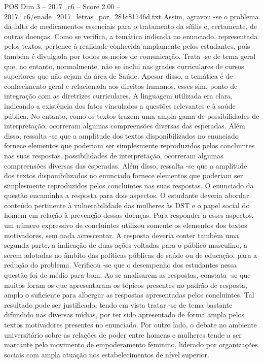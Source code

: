 \begin{textsample}{POS Dim 3 – 2017\_c6 – Score 2.00 – 2017\_c6/enade\_2017\_letras\_por\_281c81746d.txt}
Assim, agravou -se o problema da falta de medicamentos essenciais para o tratamento da sífilis e, certamente, de outras doenças.
Como se verifica, a temática indicada no enunciado, representada pelos textos, pertence à realidade conhecida amplamente pelos estudantes, pois também é divulgada por todos os meios de comunicação.
Trata -se de tema geral que, no entanto, normalmente, não se inclui nas grades curriculares de cursos superiores que não sejam da área de Saúde.
Apesar disso, a temática é de conhecimento geral e relacionada aos direitos humanos, esses sim, ponto de integração com as diretrizes curriculares.
A linguagem utilizada era clara, indicando a existência dos fatos vinculados a questões relevantes e à saúde pública.
No entanto, como os textos trazem uma ampla gama de possibilidades de interpretação, ocorreram algumas compreensões diversas das esperadas.
Além disso, ressalta -se que a amplitude dos textos disponibilizados no enunciado fornece elementos que poderiam ser simplesmente reproduzidos pelos concluintes nas suas respostas. possibilidades de interpretação, ocorreram algumas compreensões diversas das esperadas.
Além disso, ressalta -se que a amplitude dos textos disponibilizados no enunciado fornece elementos que poderiam ser simplesmente reproduzidos pelos concluintes nas suas respostas.
O enunciado da questão encaminha a resposta para dois aspectos.
O estudante deveria abordar conteúdo pertinente à vulnerabilidade das mulheres às DST e o papel social do homem em relação à prevenção dessas doenças.
Para responder a esses aspectos, um número expressivo de concluintes utilizou somente os elementos dos textos motivadores, sem nada acrescentar.
A resposta deveria conter também uma segunda parte, a indicação de duas ações voltadas para o público masculino, a serem adotadas no âmbito das políticas públicas de saúde ou de educação, para a redução do problema.
Verificou -se que o desempenho dos estudantes nessa questão foi de médio para bom.
Ao se analisarem as respostas, constata -se que muitos foram os que apresentaram os tópicos presentes no padrão de resposta, amplo o suficiente para albergar as respostas apresentadas pelos concluintes.
Tal resultado pode ser justificado, tendo em vista tratar -se de tema bastante difundido nas diversas mídias, por ter sido apresentado de forma ampla pelos textos motivadores presentes no enunciado.
Por outro lado, o debate no ambiente universitário sobre as relações de poder entre homens e mulheres tende a ser marcante pelo movimento de empoderamento feminino, liderado por organizações sociais com ampla atuação nos estabelecimentos de nível superior.

\end{textsample}
